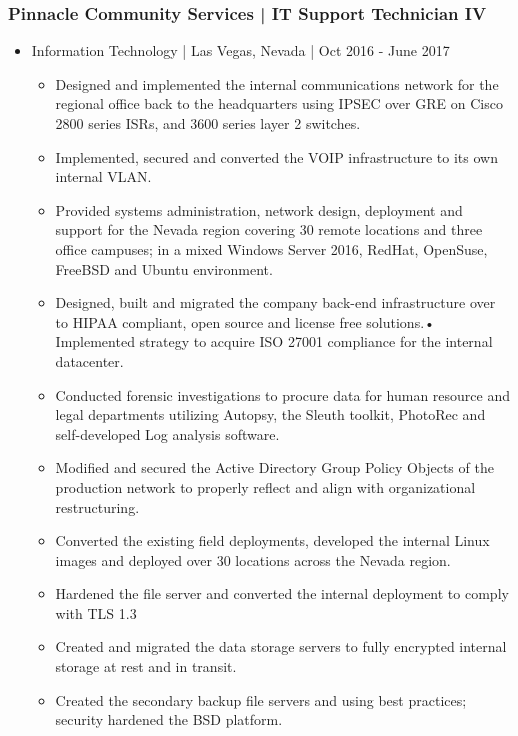 \documentclass[letter,10pt]{article}
\begin{document}
\subsubsection*{Pinnacle Community Services | IT Support Technician IV}
\label{sec:org905ba81}
\begin{itemize}
\item Information Technology | Las Vegas, Nevada | Oct 2016 - June 2017
\label{sec:org21fd264}
\begin{itemize}
\item Designed and implemented the internal communications network for the regional office back to the headquarters using IPSEC over GRE on Cisco 2800 series ISRs, and 3600 series layer 2 switches.
\item Implemented, secured and converted the VOIP infrastructure to its own internal VLAN.
\item Provided systems administration, network design, deployment and support for the Nevada region covering 30 remote locations and three office campuses; in a mixed Windows Server 2016, RedHat, OpenSuse, FreeBSD and Ubuntu environment.
\item Designed, built and migrated the company back-end infrastructure over to HIPAA compliant, open source and license free solutions.• Implemented strategy to acquire ISO 27001 compliance for the internal datacenter.
\item Conducted forensic investigations to procure data for human resource and legal departments utilizing Autopsy, the Sleuth toolkit, PhotoRec and self-developed Log analysis software.
\item Modified and secured the Active Directory Group Policy Objects of the production network to properly reflect and align with organizational restructuring.
\item Converted the existing field deployments, developed the internal Linux images and deployed over 30 locations across the Nevada region.
\item Hardened the file server and converted the internal deployment to comply with TLS 1.3
\item Created and migrated the data storage servers to fully encrypted internal storage at rest and in transit.
\item Created the secondary backup file servers and using best practices; security hardened the BSD platform.
\end{itemize}




\end{itemize}
\end{document}
